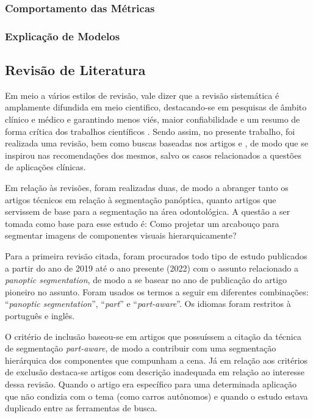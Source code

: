 \subsubsection{Comportamento das Métricas}

\subsubsection{Explicação de Modelos}


\subsection{Revisão de Literatura}
\label{project:revision}
Em meio a vários estilos de revisão, vale dizer que a revisão sistemática é amplamente difundida em meio cientifico, destacando-se em pesquisas de âmbito clínico e médico e garantindo menos viés, maior confiabilidade e um resumo de forma crítica dos trabalhos científicos \cite{barbosa2019}. Sendo assim, no presente trabalho, foi realizada uma revisão, bem como buscas baseadas nos artigos \cite{barbosa2019} e \cite{liberati2009}, de modo que se inspirou nas recomendações dos mesmos, salvo os casos relacionados a questões de aplicações clínicas.

Em relação às revisões, foram realizadas duas, de modo a abranger tanto os artigos técnicos em relação à segmentação panóptica, quanto artigos que servissem de base para a segmentação na área odontológica. A questão a ser tomada como base para esse estudo é: Como projetar um arcabouço para segmentar imagens de componentes visuais hierarquicamente?

Para a primeira revisão citada, foram procurados todo tipo de estudo publicados a partir do ano de 2019 até o ano presente (2022) com o assunto relacionado a \textit{panoptic segmentation}, de modo a se basear no ano de publicação do artigo pioneiro \cite{Kirillov2019a} no assunto. Foram usados os termos a seguir em diferentes combinações: ``\textit{panoptic segmentation}'', ``\textit{part}'' e ``\textit{part-aware}''. Os idiomas foram restritos à português e inglês.

O critério de inclusão baseou-se em artigos que possuíssem a citação da técnica de segmentação \textit{part-aware}, de modo a contribuir com uma segmentação hierárquica dos componentes que compunham a cena. Já em relação aos critérios de exclusão destaca-se artigos com descrição inadequada em relação ao interesse dessa revisão. Quando o artigo era específico para uma determinada aplicação que não condizia com o tema (como carros autônomos) e quando o estudo estava duplicado entre as ferramentas de busca.


